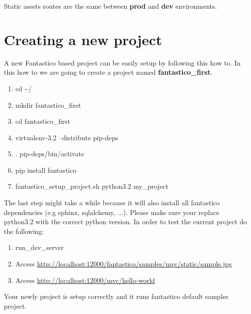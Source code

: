 \documentclass[letterpaper,10pt,english]{sphinxmanual}
\begin{document}
Static assets routes are the same between \textbf{prod} and \textbf{dev} environments.


\section{Creating a new project}
\label{how_to/new_project_how_to:creating-a-new-project}\label{how_to/new_project_how_to::doc}
A new Fantastico based project can be easily setup by following this how to. In this how to we are going to create
a project named \textbf{fantastico\_first}.
\begin{enumerate}
\item {} 
cd \textasciitilde{}/

\item {} 
mkdir fantastico\_first

\item {} 
cd fantastico\_first

\item {} 
virtualenv-3.2 --distribute pip-deps

\item {} 
. pip-deps/bin/activate

\item {} 
pip install fantastico

\item {} 
fantastico\_setup\_project.sh python3.2 my\_project

\end{enumerate}

The last step might take a while because it will also install all fantastico dependencies (e.g sphinx, sqlalchemy, ...).
Please make sure your replace python3.2 with the correct python version.
In order to test the current project do the following:
\begin{enumerate}
\item {} 
run\_dev\_server

\item {} 
Access \href{http://localhost:12000/fantastico/samples/mvc/static/sample.jpg}{http://localhost:12000/fantastico/samples/mvc/static/sample.jpg}

\item {} 
Access \href{http://localhost:12000/mvc/hello-world}{http://localhost:12000/mvc/hello-world}

\end{enumerate}

Your newly project is setup correctly and it runs fantastico default samples project.
\end{document}
